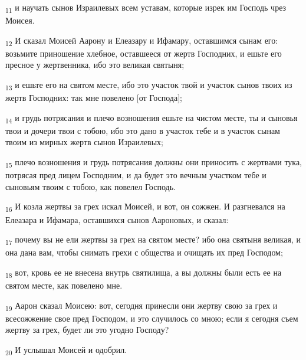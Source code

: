 \begin{tcolorbox}
\textsubscript{11} и научать сынов Израилевых всем уставам, которые изрек им Господь чрез Моисея.
\end{tcolorbox}
\begin{tcolorbox}
\textsubscript{12} И сказал Моисей Аарону и Елеазару и Ифамару, оставшимся сынам его: возьмите приношение хлебное, оставшееся от жертв Господних, и ешьте его пресное у жертвенника, ибо это великая святыня;
\end{tcolorbox}
\begin{tcolorbox}
\textsubscript{13} и ешьте его на святом месте, ибо это участок твой и участок сынов твоих из жертв Господних: так мне повелено [от Господа];
\end{tcolorbox}
\begin{tcolorbox}
\textsubscript{14} и грудь потрясания и плечо возношения ешьте на чистом месте, ты и сыновья твои и дочери твои с тобою, ибо это дано в участок тебе и в участок сынам твоим из мирных жертв сынов Израилевых;
\end{tcolorbox}
\begin{tcolorbox}
\textsubscript{15} плечо возношения и грудь потрясания должны они приносить с жертвами тука, потрясая пред лицем Господним, и да будет это вечным участком тебе и сыновьям твоим с тобою, как повелел Господь.
\end{tcolorbox}
\begin{tcolorbox}
\textsubscript{16} И козла жертвы за грех искал Моисей, и вот, он сожжен. И разгневался на Елеазара и Ифамара, оставшихся сынов Аароновых, и сказал:
\end{tcolorbox}
\begin{tcolorbox}
\textsubscript{17} почему вы не ели жертвы за грех на святом месте? ибо она святыня великая, и она дана вам, чтобы снимать грехи с общества и очищать их пред Господом;
\end{tcolorbox}
\begin{tcolorbox}
\textsubscript{18} вот, кровь ее не внесена внутрь святилища, а вы должны были есть ее на святом месте, как повелено мне.
\end{tcolorbox}
\begin{tcolorbox}
\textsubscript{19} Аарон сказал Моисею: вот, сегодня принесли они жертву свою за грех и всесожжение свое пред Господом, и это случилось со мною; если я сегодня съем жертву за грех, будет ли это угодно Господу?
\end{tcolorbox}
\begin{tcolorbox}
\textsubscript{20} И услышал Моисей и одобрил.
\end{tcolorbox}
